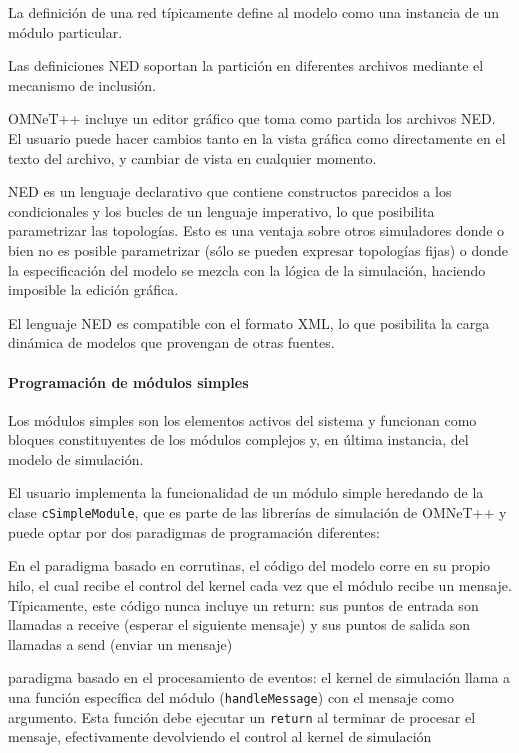 \documentclass[]{article}
\begin{document}
La definición de una red típicamente define al modelo como una instancia de un
módulo particular.


Las definiciones NED soportan la partición en diferentes archivos mediante el
mecanismo de inclusión.

OMNeT++ incluye un editor gráfico que toma como partida los archivos NED. El
usuario puede hacer cambios tanto en la vista gráfica como directamente en el
texto del archivo, y cambiar de vista en cualquier momento.

NED es un lenguaje declarativo que contiene constructos parecidos a los
condicionales y los bucles de un lenguaje imperativo, lo que posibilita
parametrizar las topologías. Esto es una ventaja sobre otros simuladores donde
o bien no es posible parametrizar (sólo se pueden expresar topologías fijas) o
donde la especificación del modelo se mezcla con la lógica de la simulación,
haciendo imposible la edición gráfica.

El lenguaje NED es compatible con el formato XML, lo que posibilita la carga
dinámica de modelos que provengan de otras fuentes.


\paragraph{Programación de módulos simples}

Los módulos simples son los elementos activos del sistema y funcionan como
bloques constituyentes de los módulos complejos y, en última instancia, del
modelo de simulación.

El usuario implementa la funcionalidad de un módulo simple heredando de la
clase \verb!cSimpleModule!, que es parte de las librerías de simulación de
OMNeT++ y puede optar por dos paradigmas de programación diferentes:



En el paradigma basado en corrutinas, el código del modelo corre en su propio
hilo, el cual recibe el control del kernel cada vez que el módulo recibe un
mensaje. Típicamente, este código nunca incluye un return: sus puntos de
entrada son llamadas a  receive (esperar el siguiente mensaje) y sus puntos de
salida son llamadas a send (enviar un mensaje)

paradigma basado en el procesamiento de eventos: el kernel de simulación llama
a una función específica del módulo (\verb!handleMessage!) con el mensaje como
argumento. Esta función debe ejecutar un \verb!return! al terminar de procesar
el mensaje, efectivamente devolviendo el control al kernel de simulación
\end{document}
